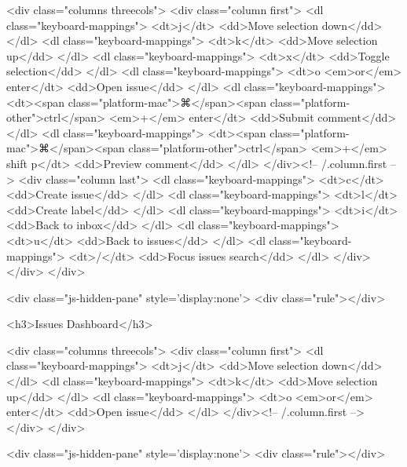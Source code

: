    <div class="columns threecols">
      <div class="column first">
        <dl class="keyboard-mappings">
          <dt>j</dt>
          <dd>Move selection down</dd>
        </dl>
        <dl class="keyboard-mappings">
          <dt>k</dt>
          <dd>Move selection up</dd>
        </dl>
        <dl class="keyboard-mappings">
          <dt>x</dt>
          <dd>Toggle selection</dd>
        </dl>
        <dl class="keyboard-mappings">
          <dt>o <em>or</em> enter</dt>
          <dd>Open issue</dd>
        </dl>
        <dl class="keyboard-mappings">
          <dt><span class="platform-mac">⌘</span><span class="platform-other">ctrl</span> <em>+</em> enter</dt>
          <dd>Submit comment</dd>
        </dl>
        <dl class="keyboard-mappings">
          <dt><span class="platform-mac">⌘</span><span class="platform-other">ctrl</span> <em>+</em> shift p</dt>
          <dd>Preview comment</dd>
        </dl>
      </div><!-- /.column.first -->
      <div class="column last">
        <dl class="keyboard-mappings">
          <dt>c</dt>
          <dd>Create issue</dd>
        </dl>
        <dl class="keyboard-mappings">
          <dt>l</dt>
          <dd>Create label</dd>
        </dl>
        <dl class="keyboard-mappings">
          <dt>i</dt>
          <dd>Back to inbox</dd>
        </dl>
        <dl class="keyboard-mappings">
          <dt>u</dt>
          <dd>Back to issues</dd>
        </dl>
        <dl class="keyboard-mappings">
          <dt>/</dt>
          <dd>Focus issues search</dd>
        </dl>
      </div>
    </div>
  </div>

  <div class="js-hidden-pane" style='display:none'>
    <div class="rule"></div>

    <h3>Issues Dashboard</h3>

    <div class="columns threecols">
      <div class="column first">
        <dl class="keyboard-mappings">
          <dt>j</dt>
          <dd>Move selection down</dd>
        </dl>
        <dl class="keyboard-mappings">
          <dt>k</dt>
          <dd>Move selection up</dd>
        </dl>
        <dl class="keyboard-mappings">
          <dt>o <em>or</em> enter</dt>
          <dd>Open issue</dd>
        </dl>
      </div><!-- /.column.first -->
    </div>
  </div>

  <div class="js-hidden-pane" style='display:none'>
    <div class="rule"></div>


